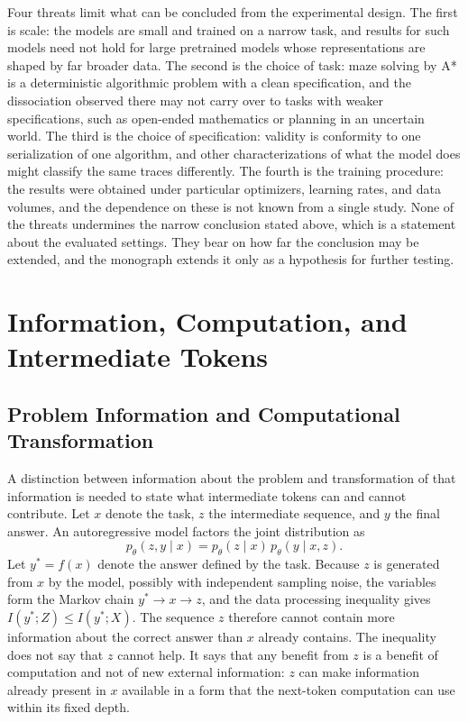 Four threats limit what can be concluded from the experimental design. The first is scale: the models are small and trained on a narrow task, and results for such models need not hold for large pretrained models whose representations are shaped by far broader data. The second is the choice of task: maze solving by A* is a deterministic algorithmic problem with a clean specification, and the dissociation observed there may not carry over to tasks with weaker specifications, such as open-ended mathematics or planning in an uncertain world. The third is the choice of specification: validity is conformity to one serialization of one algorithm, and other characterizations of what the model does might classify the same traces differently. The fourth is the training procedure: the results were obtained under particular optimizers, learning rates, and data volumes, and the dependence on these is not known from a single study. None of the threats undermines the narrow conclusion stated above, which is a statement about the evaluated settings. They bear on how far the conclusion may be extended, and the monograph extends it only as a hypothesis for further testing.

\chapter{Information, Computation, and Intermediate Tokens}
\label{ch:info}

\section{Problem Information and Computational Transformation}

A distinction between information about the problem and transformation of that information is needed to state what intermediate tokens can and cannot contribute. Let $x$ denote the task, $z$ the intermediate sequence, and $y$ the final answer. An autoregressive model factors the joint distribution as
\[
p_\theta(z,y\mid x)=p_\theta(z\mid x)\,p_\theta(y\mid x,z).
\]
Let $y^\ast=f(x)$ denote the answer defined by the task. Because $z$ is generated from $x$ by the model, possibly with independent sampling noise, the variables form the Markov chain $y^\ast\to x\to z$, and the data processing inequality gives $I(y^\ast;Z)\le I(y^\ast;X)$. The sequence $z$ therefore cannot contain more information about the correct answer than $x$ already contains. The inequality does not say that $z$ cannot help. It says that any benefit from $z$ is a benefit of computation and not of new external information: $z$ can make information already present in $x$ available in a form that the next-token computation can use within its fixed depth.

